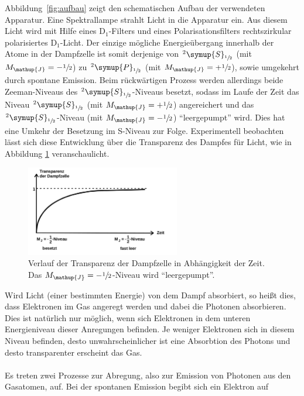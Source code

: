 \documentclass[
  bibliography=totoc,     %
  captions=tableheading,  %
  titlepage=firstiscover, %
]{scrartcl}
\begin{document}
\noindent
Abbildung~\ref{fig:aufbau} zeigt den schematischen Aufbau der verwendeten
Apparatur. Eine Spektrallampe strahlt Licht in die Apparatur ein. Aus diesem
Licht wird mit Hilfe eines $\text{D}_1$-Filters und eines Polarisationsfilters
rechtszirkular polarisiertes $\text{D}_1$-Licht. Der einzige mögliche
Energieübergang innerhalb der Atome in der Dampfzelle ist somit derjenige von
$^2\symup{S}_{\sfrac{1}{2}}$ (mit $M_{\mathup{J}}=-\sfrac{1}{2}$) zu
$^2\symup{P}_{\sfrac{1}{2}}$ (mit $M_{\mathup{J}}=+\sfrac{1}{2}$), sowie umgekehrt durch
spontane Emission. Beim rückwärtigen Prozess werden allerdings beide
Zeeman-Niveaus des $^2\symup{S}_{\sfrac{1}{2}}$-Niveaus besetzt, sodass im
Laufe der Zeit das Niveau $^2\symup{S}_{\sfrac{1}{2}}$ (mit
$M_{\mathup{J}}=+\sfrac{1}{2}$) angereichert und das
$^2\symup{S}_{\sfrac{1}{2}}$-Niveau (mit $M_{\mathup{J}}=-\sfrac{1}{2}$)
\enquote{leergepumpt} wird. Dies hat eine Umkehr der Besetzung im S-Niveau zur
Folge. Experimentell beobachten lässt sich diese Entwicklung über die
Transparenz des Dampfes für Licht, wie in Abbildung \ref{fig:transparenz} veranschaulicht.
%
\begin{figure}[htb]
  \centering
  \includegraphics[width=0.6\textwidth]{transparenz.pdf}
  \caption{Verlauf der Transparenz der Dampfzelle in Abhängigkeit der Zeit. Das $M_{\mathup{J}}=-\sfrac{1}{2}$-Niveau wird \enquote{leergepumpt}\cite{anleitung}.}
  \label{fig:transparenz}
\end{figure}
\noindent
Wird Licht (einer bestimmten Energie) von dem Dampf absorbiert, so heißt dies,
dass Elektronen im Gas angeregt werden und dabei die Photonen absorbieren. Dies
ist natürlich nur möglich, wenn sich Elektronen in dem unteren Energieniveau
dieser Anregungen befinden. Je weniger Elektronen sich in diesem Niveau
befinden, desto unwahrscheinlicher ist eine Absorbtion des Photons und desto
transparenter erscheint das Gas. \\
\\
Es treten zwei Prozesse zur Abregung, also zur Emission von Photonen aus den
Gasatomen, auf. Bei der spontanen Emission begibt sich ein Elektron auf
\end{document}
